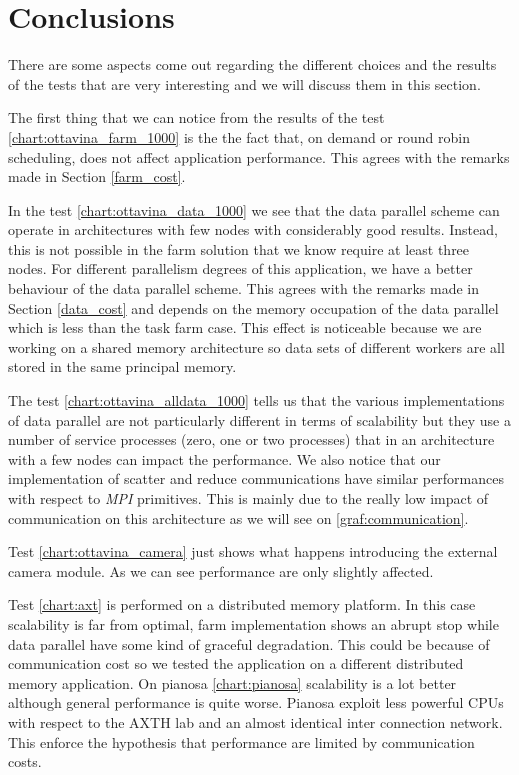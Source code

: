 \section{Conclusions}

There are some aspects come out regarding the different choices and the results of the tests that are very interesting and we will discuss them in this section.

The first thing that we can notice from the results of the test \ref{chart:ottavina_farm_1000} is the the fact that, on demand or round robin scheduling, does not affect application performance.
This agrees with the remarks made in Section \ref{farm_cost}.

In the test \ref{chart:ottavina_data_1000} we see that the data parallel scheme can operate in architectures with few nodes with considerably good results.
Instead, this is not possible in the farm solution that we know require at least three nodes. 
For different parallelism degrees of this application, we have a better behaviour of the data parallel scheme. 
This agrees with the remarks made in Section \ref{data_cost} and depends on the memory occupation of the data parallel which is less than the task farm case. 
This effect is noticeable because we are working on a shared memory architecture so data sets of different workers are all stored in the same principal memory.

The test \ref{chart:ottavina_alldata_1000} tells us that the various implementations of data parallel are not particularly different in terms of scalability but they use a number of service processes (zero, one or two processes) that in an architecture with a few nodes can impact the performance.
We also notice that our implementation of scatter and reduce communications have similar performances with respect to \textit{MPI} primitives.
This is mainly due to the really low impact of communication on this architecture as we will see on \ref{graf:communication}.

Test \ref{chart:ottavina_camera} just shows what happens introducing the external camera module. 
As we can see performance are only slightly affected.

Test \ref{chart:axt} is performed on a distributed memory platform. 
In this case scalability is far from optimal, farm implementation shows an abrupt stop while data parallel have some kind of graceful degradation.
This could be because of communication cost so we tested the application on a different distributed memory application.
On pianosa \ref{chart:pianosa} scalability is a lot better although general performance is quite worse.
Pianosa exploit less powerful CPUs with respect to the AXTH lab and an almost identical inter connection network.
This enforce the hypothesis that performance are limited by communication costs.

